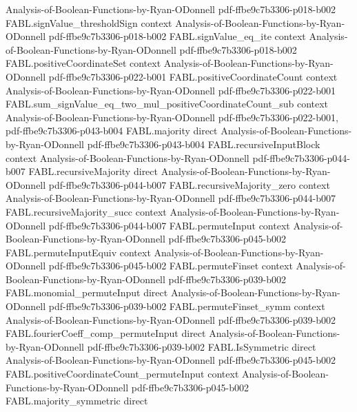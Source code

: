 \begin{theorem}
  {Analysis-of-Boolean-Functions-by-Ryan-ODonnell}
  {pdf-ffbe9c7b3306-p018-b002}
\proofstep
  {FABL.signValue_thresholdSign}
  {context}
  {Analysis-of-Boolean-Functions-by-Ryan-ODonnell}
  {pdf-ffbe9c7b3306-p018-b002}
\proofstep
  {FABL.signValue_eq_ite}
  {context}
  {Analysis-of-Boolean-Functions-by-Ryan-ODonnell}
  {pdf-ffbe9c7b3306-p018-b002}
\proofstep
  {FABL.positiveCoordinateSet}
  {context}
  {Analysis-of-Boolean-Functions-by-Ryan-ODonnell}
  {pdf-ffbe9c7b3306-p022-b001}
\proofstep
  {FABL.positiveCoordinateCount}
  {context}
  {Analysis-of-Boolean-Functions-by-Ryan-ODonnell}
  {pdf-ffbe9c7b3306-p022-b001}
\proofstep
  {FABL.sum_signValue_eq_two_mul_positiveCoordinateCount_sub}
  {context}
  {Analysis-of-Boolean-Functions-by-Ryan-ODonnell}
  {pdf-ffbe9c7b3306-p022-b001,
    pdf-ffbe9c7b3306-p043-b004}
\proofstep
  {FABL.majority}
  {direct}
  {Analysis-of-Boolean-Functions-by-Ryan-ODonnell}
  {pdf-ffbe9c7b3306-p043-b004}
\proofstep
  {FABL.recursiveInputBlock}
  {context}
  {Analysis-of-Boolean-Functions-by-Ryan-ODonnell}
  {pdf-ffbe9c7b3306-p044-b007}
\proofstep
  {FABL.recursiveMajority}
  {direct}
  {Analysis-of-Boolean-Functions-by-Ryan-ODonnell}
  {pdf-ffbe9c7b3306-p044-b007}
\proofstep
  {FABL.recursiveMajority_zero}
  {context}
  {Analysis-of-Boolean-Functions-by-Ryan-ODonnell}
  {pdf-ffbe9c7b3306-p044-b007}
\proofstep
  {FABL.recursiveMajority_succ}
  {context}
  {Analysis-of-Boolean-Functions-by-Ryan-ODonnell}
  {pdf-ffbe9c7b3306-p044-b007}
\proofstep
  {FABL.permuteInput}
  {context}
  {Analysis-of-Boolean-Functions-by-Ryan-ODonnell}
  {pdf-ffbe9c7b3306-p045-b002}
\proofstep
  {FABL.permuteInputEquiv}
  {context}
  {Analysis-of-Boolean-Functions-by-Ryan-ODonnell}
  {pdf-ffbe9c7b3306-p045-b002}
\proofstep
  {FABL.permuteFinset}
  {context}
  {Analysis-of-Boolean-Functions-by-Ryan-ODonnell}
  {pdf-ffbe9c7b3306-p039-b002}
\proofstep
  {FABL.monomial_permuteInput}
  {direct}
  {Analysis-of-Boolean-Functions-by-Ryan-ODonnell}
  {pdf-ffbe9c7b3306-p039-b002}
\proofstep
  {FABL.permuteFinset_symm}
  {context}
  {Analysis-of-Boolean-Functions-by-Ryan-ODonnell}
  {pdf-ffbe9c7b3306-p039-b002}
\proofstep
  {FABL.fourierCoeff_comp_permuteInput}
  {direct}
  {Analysis-of-Boolean-Functions-by-Ryan-ODonnell}
  {pdf-ffbe9c7b3306-p039-b002}
\proofstep
  {FABL.IsSymmetric}
  {direct}
  {Analysis-of-Boolean-Functions-by-Ryan-ODonnell}
  {pdf-ffbe9c7b3306-p045-b002}
\proofstep
  {FABL.positiveCoordinateCount_permuteInput}
  {context}
  {Analysis-of-Boolean-Functions-by-Ryan-ODonnell}
  {pdf-ffbe9c7b3306-p045-b002}
\proofstep
  {FABL.majority_symmetric}
  {direct}

\end{theorem}
